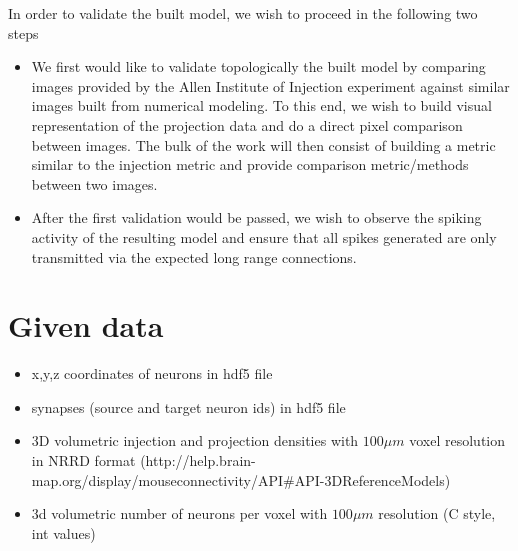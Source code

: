 \documentclass[a4paper]{IEEEtran}
\begin{document}
   
   In order to validate the built model, we wish to proceed in the following two steps
\begin{itemize} 
\item We first would like to validate topologically the built model by comparing images provided by the Allen Institute of Injection experiment against 
similar images built from numerical modeling. To this end, we wish to build visual representation of the projection data and do a direct pixel comparison between images. The bulk of the work will then consist of building a metric similar to the injection metric and provide comparison metric/methods between two images.
\item After the first validation would be passed, we wish to observe the spiking activity of the resulting model and ensure that all spikes generated are only transmitted via the expected long range connections. 
\end{itemize}
   
   \section{Given data}
   \begin{itemize}
      \item x,y,z coordinates of neurons in hdf5 file
      \item synapses (source and target neuron ids) in hdf5 file
	  \item 3D volumetric injection and projection densities with $100\mu m$ voxel resolution in NRRD format
	  (http://help.brain-map.org/display/mouseconnectivity/API\#API-3DReferenceModels)
	  \item 3d volumetric number of neurons per voxel with $100\mu m$ resolution (C style, int values)
   \end{itemize}
   
   \begin{figure}[ht!]
   	\begin{center}
        \hspace{0.1cm}
    	   \end{center}
   \label{fig:atlas}
   \end{figure}
   
\end{document}
